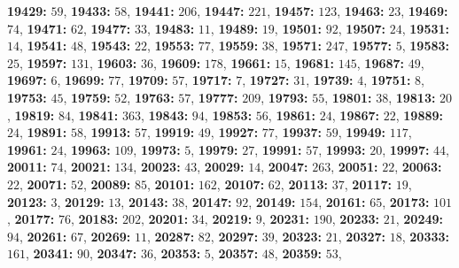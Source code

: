 \textsf{\bfseries 19429:} $59$, \textsf{\bfseries 19433:} $58$, \textsf{\bfseries 19441:} $206$, \textsf{\bfseries 19447:} $221$, \textsf{\bfseries 19457:} $123$, \textsf{\bfseries 19463:} $23$, \textsf{\bfseries 19469:} $74$, \textsf{\bfseries 19471:} $62$, \textsf{\bfseries 19477:} $33$, \textsf{\bfseries 19483:} $11$, \textsf{\bfseries 19489:} $19$, \textsf{\bfseries 19501:} $92$, \textsf{\bfseries 19507:} $24$, \textsf{\bfseries 19531:} $14$, \textsf{\bfseries 19541:} $48$, \textsf{\bfseries 19543:} $22$, \textsf{\bfseries 19553:} $77$, \textsf{\bfseries 19559:} $38$, \textsf{\bfseries 19571:} $247$, \textsf{\bfseries 19577:} $5$, \textsf{\bfseries 19583:} $25$, \textsf{\bfseries 19597:} $131$, \textsf{\bfseries 19603:} $36$, \textsf{\bfseries 19609:} $178$, \textsf{\bfseries 19661:} $15$, \textsf{\bfseries 19681:} $145$, \textsf{\bfseries 19687:} $49$, \textsf{\bfseries 19697:} $6$, \textsf{\bfseries 19699:} $77$, \textsf{\bfseries 19709:} $57$, \textsf{\bfseries 19717:} $7$, \textsf{\bfseries 19727:} $31$, \textsf{\bfseries 19739:} $4$, \textsf{\bfseries 19751:} $8$, \textsf{\bfseries 19753:} $45$, \textsf{\bfseries 19759:} $52$, \textsf{\bfseries 19763:} $57$, \textsf{\bfseries 19777:} $209$, \textsf{\bfseries 19793:} $55$, \textsf{\bfseries 19801:} $38$, \textsf{\bfseries 19813:} $20$, \textsf{\bfseries 19819:} $84$, \textsf{\bfseries 19841:} $363$, \textsf{\bfseries 19843:} $94$, \textsf{\bfseries 19853:} $56$, \textsf{\bfseries 19861:} $24$, \textsf{\bfseries 19867:} $22$, \textsf{\bfseries 19889:} $24$, \textsf{\bfseries 19891:} $58$, \textsf{\bfseries 19913:} $57$, \textsf{\bfseries 19919:} $49$, \textsf{\bfseries 19927:} $77$, \textsf{\bfseries 19937:} $59$, \textsf{\bfseries 19949:} $117$, \textsf{\bfseries 19961:} $24$, \textsf{\bfseries 19963:} $109$, \textsf{\bfseries 19973:} $5$, \textsf{\bfseries 19979:} $27$, \textsf{\bfseries 19991:} $57$, \textsf{\bfseries 19993:} $20$, \textsf{\bfseries 19997:} $44$, \textsf{\bfseries 20011:} $74$, \textsf{\bfseries 20021:} $134$, \textsf{\bfseries 20023:} $43$, \textsf{\bfseries 20029:} $14$, \textsf{\bfseries 20047:} $263$, \textsf{\bfseries 20051:} $22$, \textsf{\bfseries 20063:} $22$, \textsf{\bfseries 20071:} $52$, \textsf{\bfseries 20089:} $85$, \textsf{\bfseries 20101:} $162$, \textsf{\bfseries 20107:} $62$, \textsf{\bfseries 20113:} $37$, \textsf{\bfseries 20117:} $19$, \textsf{\bfseries 20123:} $3$, \textsf{\bfseries 20129:} $13$, \textsf{\bfseries 20143:} $38$, \textsf{\bfseries 20147:} $92$, \textsf{\bfseries 20149:} $154$, \textsf{\bfseries 20161:} $65$, \textsf{\bfseries 20173:} $101$, \textsf{\bfseries 20177:} $76$, \textsf{\bfseries 20183:} $202$, \textsf{\bfseries 20201:} $34$, \textsf{\bfseries 20219:} $9$, \textsf{\bfseries 20231:} $190$, \textsf{\bfseries 20233:} $21$, \textsf{\bfseries 20249:} $94$, \textsf{\bfseries 20261:} $67$, \textsf{\bfseries 20269:} $11$, \textsf{\bfseries 20287:} $82$, \textsf{\bfseries 20297:} $39$, \textsf{\bfseries 20323:} $21$, \textsf{\bfseries 20327:} $18$, \textsf{\bfseries 20333:} $161$, \textsf{\bfseries 20341:} $90$, \textsf{\bfseries 20347:} $36$, \textsf{\bfseries 20353:} $5$, \textsf{\bfseries 20357:} $48$, \textsf{\bfseries 20359:} $53$, 
